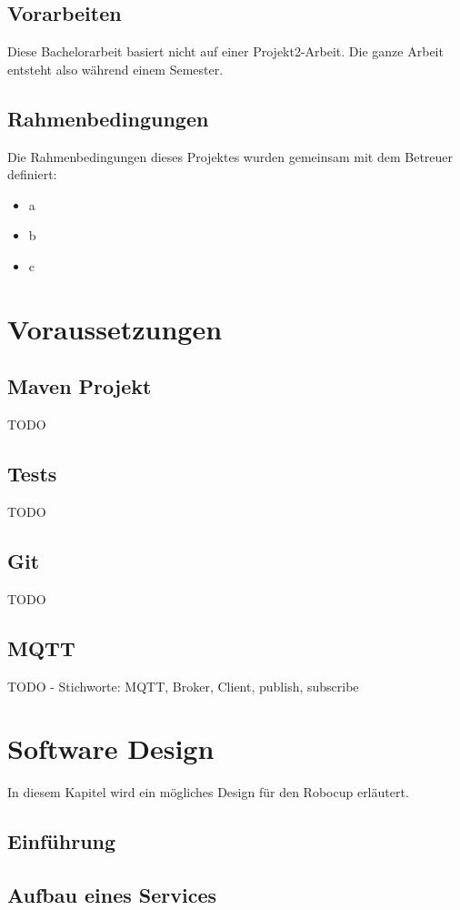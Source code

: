 \documentclass[11pt,english,german]{report}
\begin{document}
\section{Vorarbeiten}
Diese Bachelorarbeit basiert nicht auf einer Projekt2-Arbeit. Die ganze Arbeit entsteht also während einem Semester.

\section{Rahmenbedingungen}
Die Rahmenbedingungen dieses Projektes wurden gemeinsam mit dem Betreuer definiert:
\begin{itemize}
\item a
\item b
\item c
\end{itemize}


\chapter{Voraussetzungen}
\section{Maven Projekt}
TODO
\section{Tests}
TODO
\section{Git}
TODO
\section{MQTT}
TODO - Stichworte: \gls{MQTT}, Broker, Client, publish, subscribe
\chapter{Software Design}
In diesem Kapitel wird ein mögliches Design für den Robocup erläutert.
\section{Einführung}



\section{Aufbau eines Services}
\end{document}
